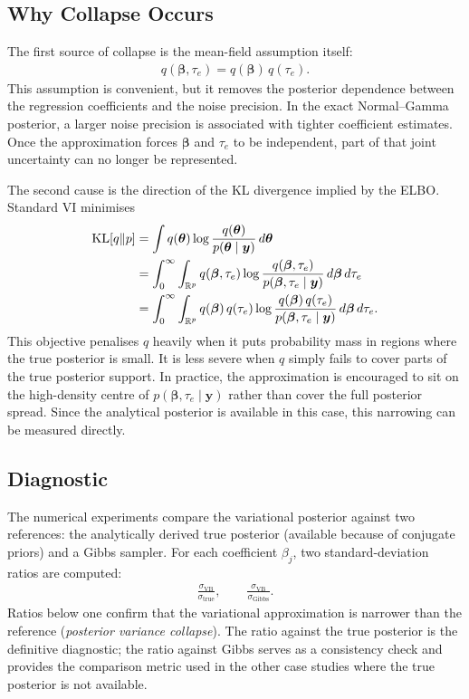 \documentclass[11pt,a4paper]{article}
\newcommand{\R}{\mathbb{R}}
\begin{document}
\subsection{Why Collapse Occurs}

The first source of collapse is the mean-field assumption itself:
\begin{align}
q(\bm{\beta},\tau_e) = q(\bm{\beta})\,q(\tau_e).
\end{align}
This assumption is convenient, but it removes the posterior dependence between the regression coefficients and the noise precision. In the exact Normal--Gamma posterior, a larger noise precision is associated with tighter coefficient estimates. Once the approximation forces $\bm{\beta}$ and $\tau_e$ to be independent, part of that joint uncertainty can no longer be represented.

The second cause is the direction of the KL divergence implied by the ELBO. Standard VI minimises
\begin{align}
\mathrm{KL}[q\|p] &= \int q(\bm{\theta})\log\frac{q(\bm{\theta})}{p(\bm{\theta}\mid\bm{y})}\,d\bm{\theta} \notag\\
                   &= \int_0^\infty \int_{\R^p} q(\bm{\beta},\tau_e)\log\frac{q(\bm{\beta},\tau_e)}{p(\bm{\beta},\tau_e\mid\bm{y})}\,d\bm{\beta}\,d\tau_e \notag\\
                   &= \int_0^\infty \int_{\R^p} q(\bm{\beta})\,q(\tau_e)\log\frac{q(\bm{\beta})\,q(\tau_e)}{p(\bm{\beta},\tau_e\mid\bm{y})}\,d\bm{\beta}\,d\tau_e.
\end{align}
This objective penalises $q$ heavily when it puts probability mass in regions where the true posterior is small. It is less severe when $q$ simply fails to cover parts of the true posterior support. In practice, the approximation is encouraged to sit on the high-density centre of $p(\bm{\beta},\tau_e\mid\bm{y})$ rather than cover the full posterior spread. Since the analytical posterior is available in this case, this narrowing can be measured directly.

\subsection{Diagnostic}

The numerical experiments compare the variational posterior against two references: the analytically derived true posterior (available because of conjugate priors) and a Gibbs sampler. For each coefficient $\beta_j$, two standard-deviation ratios are computed:
\begin{align}
\frac{\sigma_{\mathrm{VB}}}{\sigma_{\mathrm{true}}}, \qquad \frac{\sigma_{\mathrm{VB}}}{\sigma_{\mathrm{Gibbs}}}.
\end{align}
Ratios below one confirm that the variational approximation is narrower than the reference (\emph{posterior variance collapse}). The ratio against the true posterior is the definitive diagnostic; the ratio against Gibbs serves as a consistency check and provides the comparison metric used in the other case studies where the true posterior is not available.
\end{document}
